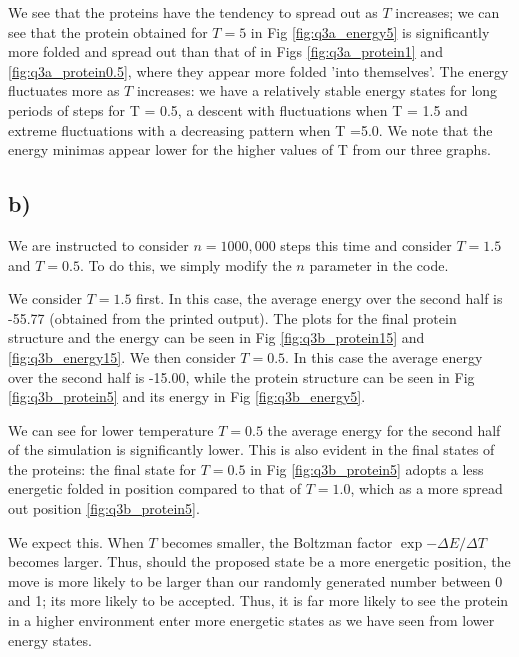 \documentclass{article}
\begin{document}
We see that the proteins have the tendency to spread out as $T$ increases; we can see that the protein obtained for $T = 5$ in Fig \ref{fig:q3a_energy5} is significantly more folded and spread out than that of in Figs \ref{fig:q3a_protein1} and \ref{fig:q3a_protein0.5}, where they appear more folded 'into themselves'. The energy fluctuates more as $T$ increases: we have a relatively stable energy states for long periods of steps for T = 0.5, a descent with fluctuations when T = 1.5 and extreme fluctuations with a decreasing pattern when T =5.0. We note that the energy minimas appear lower for the higher values of T from our three graphs. 


\subsection*{b)}
We are instructed to consider $n = 1000,000$ steps this time and consider $T = 1.5$ and $T =0.5$. To do this, we simply modify the $n$ parameter in the code. 

We consider $T=1.5$ first. In this case, the average energy over the second half is -55.77 (obtained from the printed output). The plots for the final protein structure and the energy can be seen in Fig \ref{fig:q3b_protein15} and \ref{fig:q3b_energy15}. We then consider $T = 0.5$. In this case the average energy over the second half is -15.00, while the protein structure can be seen in Fig \ref{fig:q3b_protein5} and its energy in Fig \ref{fig:q3b_energy5}. 

We can see for lower temperature $T = 0.5$ the average energy for the second half of the simulation is significantly lower. This is also evident in the final states of the proteins: the final state for $T = 0.5$ in Fig \ref{fig:q3b_protein5} adopts a less energetic folded in position compared to that of $T = 1.0$, which as a more spread out position \ref{fig:q3b_protein5}. 

We expect this. When $T$ becomes smaller, the Boltzman factor $\exp{- \Delta E/ \Delta T}$ becomes larger. Thus, should the proposed state be a more energetic position, the move is more likely to be larger than our randomly generated number between 0 and 1; its more likely to be accepted. Thus, it is far more likely to see the protein in a higher environment enter more energetic states as we have seen from lower energy states.  
\end{document}
